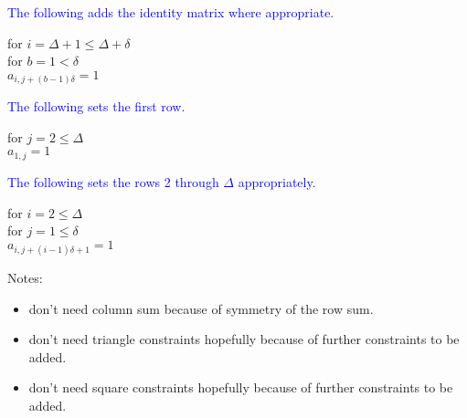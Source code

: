 \documentclass[a4paper]{article}
\begin{document}
\vspace{0.5em}
\textcolor{blue}{The following adds the identity matrix where appropriate.}

\vspace{0.5em}
for $i=\Delta+1\leq\Delta+\delta$\\
\-\hspace{1.5cm}for $b=1<\delta$ \\
\-\hspace{3cm}$a_{i,j+(b-1)\delta}=1$

\vspace{0.5em}
\textcolor{blue}{The following sets the first row.}

\vspace{0.5em}
for $j=2\leq\Delta$\\
\-\hspace{1.5cm} $a_{1,j}=1$

\vspace{0.5em}
\textcolor{blue}{The following sets the rows 2 through $\Delta$ appropriately.}

\vspace{0.5em}
for $i=2\leq\Delta$\\
\-\hspace{1.5cm}for $j=1\leq\delta$\\
\-\hspace{3cm}$a_{i,j+(i-1)\delta+1}=1$

\vspace{0.5em}
\noindent Notes:
\begin{itemize}
\item don't need column sum because of symmetry of the row sum.
\item don't need triangle constraints hopefully because of further constraints to be added.
\item don't need square constraints hopefully because of further constraints to be added.
\end{itemize}
\end{document}
